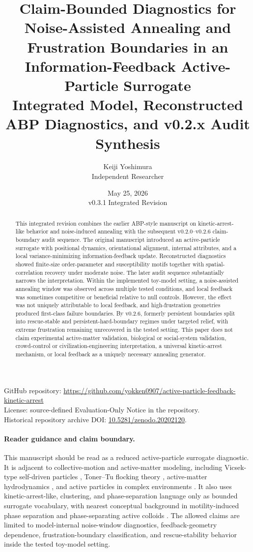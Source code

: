 \documentclass[11pt]{article}
\title{Claim-Bounded Diagnostics for Noise-Assisted Annealing and Frustration Boundaries in an Information-Feedback Active-Particle Surrogate\\\large Integrated Model, Reconstructed ABP Diagnostics, and v0.2.x Audit Synthesis}
\author{Keiji Yoshimura\\\small Independent Researcher}
\date{May 25, 2026\\\small v0.3.1 Integrated Revision}
\begin{document}
\maketitle

\begin{center}
\small
GitHub repository: \url{https://github.com/yokken0907/active-particle-feedback-kinetic-arrest}\\
License: source-defined Evaluation-Only Notice in the repository.\\
Historical repository archive DOI: \href{https://doi.org/10.5281/zenodo.20202120}{10.5281/zenodo.20202120}.
\end{center}

\begin{abstract}
This integrated revision combines the earlier ABP-style manuscript on kinetic-arrest-like behavior and noise-induced annealing with the subsequent v0.2.0--v0.2.6 claim-boundary audit sequence. The original manuscript introduced an active-particle surrogate with positional dynamics, orientational alignment, internal attributes, and a local variance-minimizing information-feedback update. Reconstructed diagnostics showed finite-size order-parameter and susceptibility motifs together with spatial-correlation recovery under moderate noise. The later audit sequence substantially narrows the interpretation. Within the implemented toy-model setting, a noise-assisted annealing window was observed across multiple tested conditions, and local feedback was sometimes competitive or beneficial relative to null controls. However, the effect was not uniquely attributable to local feedback, and high-frustration geometries produced first-class failure boundaries. By v0.2.6, formerly persistent boundaries split into rescue-stable and persistent-hard-boundary regimes under targeted relief, with extreme frustration remaining unrecovered in the tested setting. This paper does not claim experimental active-matter validation, biological or social-system validation, crowd-control or civilization-engineering interpretation, a universal kinetic-arrest mechanism, or local feedback as a uniquely necessary annealing generator.
\end{abstract}

\paragraph{Reader guidance and claim boundary.}
This manuscript should be read as a reduced active-particle surrogate diagnostic. It is adjacent to collective-motion and active-matter modeling, including Vicsek-type self-driven particles \cite{vicsek1995}, Toner--Tu flocking theory \cite{toner1998}, active-matter hydrodynamics \cite{marchetti2013}, and active particles in complex environments \cite{bechinger2016}. It also uses kinetic-arrest-like, clustering, and phase-separation language only as bounded surrogate vocabulary, with nearest conceptual background in motility-induced phase separation and phase-separating active colloids \cite{cates2015,fily2012,redner2013}. The allowed claims are limited to model-internal noise-window diagnostics, feedback-geometry dependence, frustration-boundary classification, and rescue-stability behavior inside the tested toy-model setting.
\end{document}
